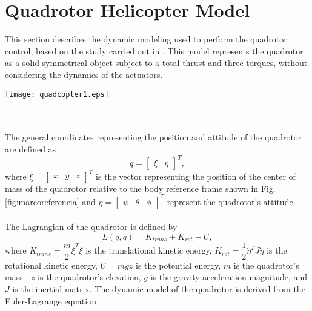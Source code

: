 \chapter{Quadrotor Helicopter Model \label{ch:model}}
This section describes the dynamic modeling used to perform the quadrotor control, based on the study carried out in \cite{modelamiento, modelamientoPDAFC, modelamientoNCQ}. This model represents the quadrotor as a solid symmetrical object subject to a total thrust and three torques, without considering the dynamics of the actuators.
\begin{figure*}
\begin{center}
  \texttt{[image: quadcopter1.eps]}
\caption{Quadrotor squeme with movement axis and thrust forces.} 
    \label{fig:marcoreferencia}
    \end{center}
\end{figure*}
\\\\The general coordinates representing the position and attitude of the quadrotor are defined as
\begin{equation}
	q=\begin{bmatrix}
	\xi & \eta
	\end{bmatrix}^{T},
	\label{ec:coorgenerales}
\end{equation}
where $\xi=\begin{bmatrix}
x & y & z
\end{bmatrix}^{T}$ is the vector representing the position of the center of mass of the quadrotor relative to the body reference frame shown in Fig. \ref{fig:marcoreferencia} and $\eta=\begin{bmatrix}
\psi & \theta & \phi
\end{bmatrix}^{T}$ represent the quadrotor's attitude.
\\\\
The Lagrangian of the quadrotor is defined by
\begin{equation}
	L(q,\dot{q})=K_{trans}+K_{rot} - U,	
	\label{ec:lagrangiano}
\end{equation}
where $ K_{trans} = \dfrac{m}{2}\dot{\xi}^{T}\dot{\xi} $ is the translational kinetic energy, $ K_{rot} = \dfrac{1}{2}\dot{\eta}^{T}J\dot{\eta} $ is the rotational kinetic energy, $ U=mgz $ is the potential energy, $m$ is the quadrotor's mass , $z$ is the quadrotor's elevation, $g$ is the gravity acceleration magnitude, and $J$ is the inertial matrix. The dynamic model of the quadrotor is derived from the Euler-Lagrange equation
